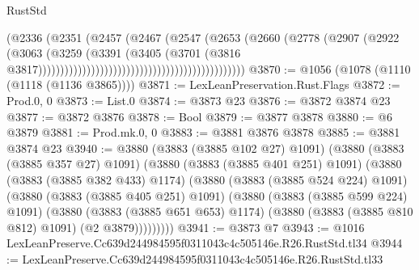 \begin{lexlean}{RustStd}
\begin{coremodule}
                                                                  (@2336
                                                                    (@2351
                                                                      (@2457
                                                                        (@2467
                                                                          (@2547
                                                                            (@2653
                                                                              (@2660
                                                                                (@2778
                                                                                  (@2907
                                                                                    (@2922
                                                                                      (@3063
                                                                                        (@3259
                                                                                          (@3391
                                                                                            (@3405
                                                                                              (@3701
                                                                                                (@3816
                                                                                                  @3817)))))))))))))))))))))))))))))))))))))))))))))))
@3870 := @1056 (@1078 (@1110 (@1118 (@1136 @3865))))
@3871 := LexLeanPreservation.Rust.Flags
@3872 := Prod.{0, 0}
@3873 := List.{0}
@3874 := @3873 @23
@3876 := @3872 @3874 @23
@3877 := @3872 @3876
@3878 := Bool
@3879 := @3877 @3878
@3880 := @6 @3879
@3881 := Prod.mk.{0, 0}
@3883 := @3881 @3876 @3878
@3885 := @3881 @3874 @23
@3940 := @3880
    (@3883 (@3885 @102 @27) @1091)
    (@3880
      (@3883 (@3885 @357 @27) @1091)
      (@3880
        (@3883 (@3885 @401 @251) @1091)
        (@3880
          (@3883 (@3885 @382 @433) @1174)
          (@3880
            (@3883 (@3885 @524 @224) @1091)
            (@3880
              (@3883 (@3885 @405 @251) @1091)
              (@3880
                (@3883 (@3885 @599 @224) @1091)
                (@3880
                  (@3883 (@3885 @651 @653) @1174)
                  (@3880 (@3883 (@3885 @810 @812) @1091) (@2 @3879)))))))))
@3941 := @3873 @7
@3943 := @1016 LexLeanPreserve.Cc639d244984595f0311043c4c505146e.R26.RustStd.tl34
@3944 := LexLeanPreserve.Cc639d244984595f0311043c4c505146e.R26.RustStd.tl33

\end{coremodule}
\end{lexlean}

